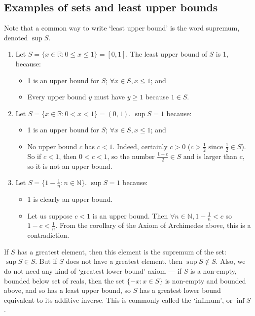 \subsection{Examples of sets and least upper bounds}
Note that a common way to write `least upper bound' is the word supremum, denoted \(\sup S\).
\begin{enumerate}
	\item Let \(S = \{ x \in \mathbb R: 0 \leq x \leq 1 \} = [0, 1]\).
	      The least upper bound of \(S\) is 1, because:
	      \begin{itemize}
		      \item 1 is an upper bound for \(S\); \(\forall x \in S, x\leq1 \); and
		      \item Every upper bound \(y\) must have \(y \geq 1\) because \(1 \in S\).
	      \end{itemize}
	\item Let \(S = \{ x \in \mathbb R: 0 < x < 1 \} = (0, 1)\).
	      \(\sup S = 1\) because:
	      \begin{itemize}
		      \item 1 is an upper bound for \(S\); \(\forall x \in S, x \leq 1\); and
		      \item No upper bound \(c\) has \(c<1\).
		            Indeed, certainly \(c>0\) (\(c > \frac{1}{2}\) since \(\frac{1}{2} \in S\)).
		            So if \(c<1\), then \(0<c<1\), so the number \(\frac{1+c}{2} \in S\) and is larger than \(c\), so it is not an upper bound.
	      \end{itemize}
	\item Let \(S = \{ 1 - \frac{1}{n}: n \in \mathbb N \}\).
	      \(\sup S = 1\) because:
	      \begin{itemize}
		      \item 1 is clearly an upper bound.
		      \item Let us suppose \(c < 1\) is an upper bound.
		            Then \(\forall n \in \mathbb N, 1 - \frac{1}{n} < c\) so \(1 - c < \frac{1}{n}\).
		            From the corollary of the Axiom of Archimedes above, this is a contradiction.
	      \end{itemize}
\end{enumerate}
\begin{remark}
	If \(S\) has a greatest element, then this element is the supremum of the set: \(\sup S \in S\).
	But if \(S\) does not have a greatest element, then \(\sup S \notin S\).
	Also, we do not need any kind of `greatest lower bound' axiom --- if \(S\) is a non-empty, bounded below set of reals, then the set \(\{ -x: x \in S \}\) is non-empty and bounded above, and so has a least upper bound, so \(S\) has a greatest lower bound equivalent to its additive inverse.
	This is commonly called the `infimum', or \(\inf S\).
\end{remark}

